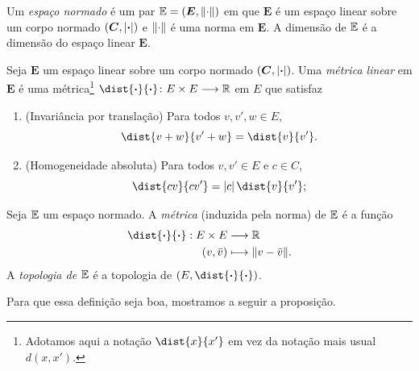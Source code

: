 \begin{defi}
Um \emph{espaço normado} é um par $\mathbb{E} = (\bm E,\left\Vert{\cdot}\right\Vert)$ em que $\bm E$ é um espaço linear sobre um corpo normado $(\bm C,\left\vert{\bm{\cdot}}\right\vert)$ e $\left\Vert{\cdot}\right\Vert$ é uma norma em $\bm E$. A dimensão de $\mathbb{E}$ é a dimensão do espaço linear $\bm E$.
\end{defi}

\begin{defi}
Seja $\bm E$ um espaço linear sobre um corpo normado $(\bm C,\left\vert{\bm{\cdot}}\right\vert)$. Uma \emph{métrica linear} em $\bm E$ é uma métrica\footnote{Adotamos aqui a notação $\dist{x}{x'}$ em vez da notação mais usual $d(x,x')$.} $\dist{\var}{\var}\colon E \times E \to \R$ em $E$ que satisfaz
	\begin{enumerate}
	\item (Invariância por translação) Para todos $v,v',w \in E$,
		\begin{equation*}
		\dist{v+w}{v'+w} = \dist{v}{v'}.
		\end{equation*}
	\item (Homogeneidade absoluta) Para todos $v,v' \in E$ e $c \in C$,
		\begin{equation*}
		\dist{cv}{cv'} = \abs{c}\dist{v}{v'};
		\end{equation*}
	\end{enumerate}
\end{defi}

\begin{defi}
Seja $\mathbb{E}$ um espaço normado. A \emph{métrica} (induzida pela norma) de $\mathbb{E}$ é a função
	\begin{align*}
	\func{\dist{\var}{\var}}{E \times E}{\R}{(v,\bar v)}{\nor{v - \bar v}}.
	\end{align*}	
A \emph{topologia de $\mathbb{E}$} é a topologia de $(E,\dist{\var}{\var})$.
\end{defi}

Para que essa definição seja boa, mostramos a seguir a proposição.


